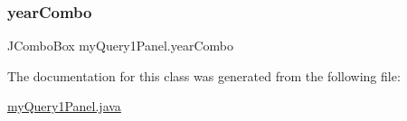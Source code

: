 \subsubsection{\texorpdfstring{year\+Combo}{yearCombo}}
{\footnotesize\ttfamily J\+Combo\+Box my\+Query1\+Panel.\+year\+Combo\hspace{0.3cm}{\ttfamily [protected]}}



The documentation for this class was generated from the following file\+:\begin{DoxyCompactItemize}
\item 
\hyperlink{my_query1_panel_8java}{my\+Query1\+Panel.\+java}\end{DoxyCompactItemize}
